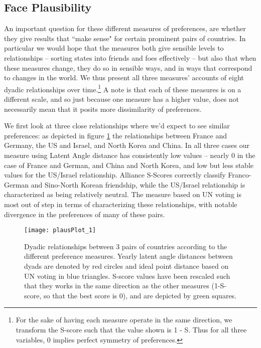 \subsection*{Face Plausibility}

An important question for these different measures of preferences, are whether they give results that ``make sense" for certain prominent pairs of countries. In particular we would hope that the measures both give sensible levels to relationships -- sorting states into friends and foes effectively -- but also that when these measures change, they do so in sensible ways, and in ways that correspond to changes in the world. We thus present all three measures' accounts of eight dyadic relationships over time.\footnote{For the sake of having each measure operate in the same direction, we transform the S-score such that the value shown is 1 - S. Thus for all three variables, $0$ implies perfect symmetry of preferences.} A note is that each of these measures is on a different scale, and so just because one measure has a higher value, does not necessarily mean that it posits more dissimilarity of preferences.

We first look at three close relationships where we'd expect to see similar preferences: as depicted in figure \ref{friendly:dyads} the relationships between France and Germany, the US and Israel, and North Korea and China. In all three cases our measure using Latent Angle distance has consistently low values -- nearly $0$ in the case of France and German, and China and North Korea, and low but less stable values for the US/Israel relationship. Alliance S-Scores correctly classify Franco-German and Sino-North Korean friendship, while the US/Israel relationship is characterized as being relatively neutral. The measure based on UN voting is most out of step in terms of characterizing these relationships, with notable divergence in the preferences of many of these pairs.

\begin{figure}
	\centering
	\texttt{[image: plausPlot\_1]}
	\caption{Dyadic relationships between 3 pairs of countries according to the different preference measures. Yearly latent angle distances between dyads are denoted by red circles and ideal point distance based on UN voting in blue triangles. S-score values have been rescaled such that they works in the same direction as the other measures (1-S-score, so that the best score is 0), and are depicted by green squares.}
	\label{friendly:dyads}
\end{figure}

